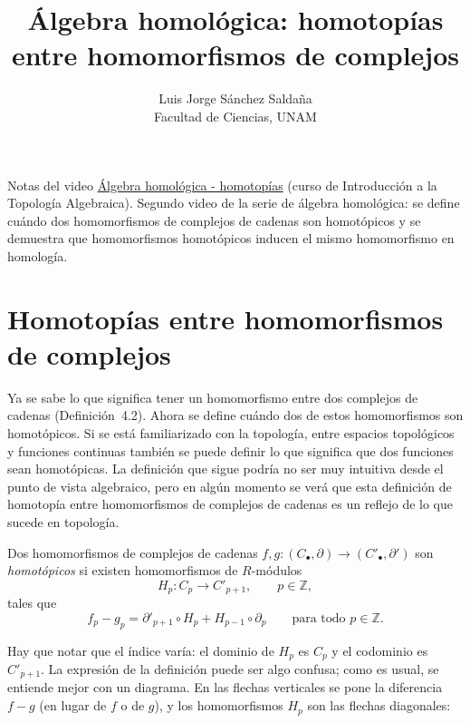 \documentclass[11pt]{article}
\title{Álgebra homológica: homotopías entre homomorfismos de complejos}
\author{Luis Jorge Sánchez Saldaña\\[2pt]\small Facultad de Ciencias, UNAM}
\date{}
\begin{document}
\maketitle

\noindent\small Notas del video
\href{https://www.youtube.com/watch?v=E86PPBlXeHI}{\guillemotleft{}Álgebra homológica - homotopías\guillemotright{}}
(curso de Introducción a la Topología Algebraica). Segundo video de la serie de álgebra homológica: se define cuándo dos homomorfismos de complejos de cadenas son homotópicos y se demuestra que homomorfismos homotópicos inducen el mismo homomorfismo en homología.
\normalsize

\section*{Homotopías entre homomorfismos de complejos}

Ya se sabe lo que significa tener un homomorfismo entre dos complejos de cadenas (Definición~4.2). Ahora se define cuándo dos de estos homomorfismos son homotópicos. Si se está familiarizado con la topología, entre espacios topológicos y funciones continuas también se puede definir lo que significa que dos funciones sean homotópicas. La definición que sigue podría no ser muy intuitiva desde el punto de vista algebraico, pero en algún momento se verá que esta definición de homotopía entre homomorfismos de complejos de cadenas es un reflejo de lo que sucede en topología.

\begin{defn}\label{def:homotopia-complejos}
Dos homomorfismos de complejos de cadenas $f,g\colon(C_\bullet,\partial)\to(C'_\bullet,\partial')$ son \emph{homotópicos} si existen homomorfismos de $R$-módulos
\[
  H_p\colon C_p\longrightarrow C'_{p+1},\qquad p\in\mathbb Z,
\]
tales que
\[
  f_p-g_p=\partial'_{p+1}\circ H_p+H_{p-1}\circ\partial_p\qquad\text{para todo }p\in\mathbb Z.
\]
\end{defn}

Hay que notar que el índice varía: el dominio de $H_p$ es $C_p$ y el codominio es $C'_{p+1}$. La expresión de la definición puede ser algo confusa; como es usual, se entiende mejor con un diagrama. En las flechas verticales se pone la diferencia $f-g$ (en lugar de $f$ o de $g$), y los homomorfismos $H_p$ son las flechas diagonales:
\end{document}
